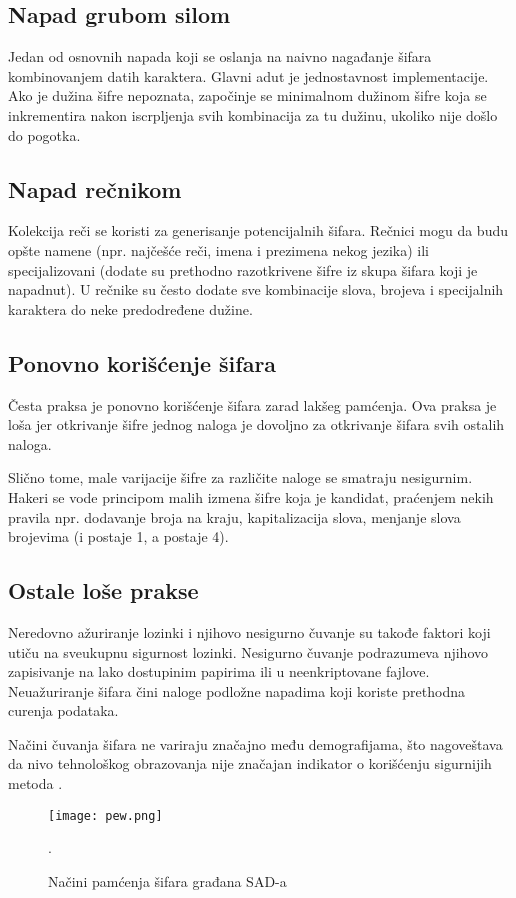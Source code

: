 \documentclass[fleqn, 12pt]{article}
\begin{document}
\subsection{Napad grubom silom}
\indent Jedan od osnovnih napada koji se oslanja na naivno nagađanje šifara kombinovanjem datih karaktera. Glavni adut je jednostavnost implementacije. Ako je dužina šifre nepoznata, započinje se minimalnom dužinom šifre koja se inkrementira nakon iscrpljenja svih kombinacija za tu dužinu, ukoliko nije došlo do pogotka\cite{napadi}.

\subsection{Napad rečnikom}
\indent Kolekcija reči se koristi za generisanje potencijalnih šifara. Rečnici mogu da budu opšte namene (npr. najčešće reči, imena i prezimena nekog jezika) ili specijalizovani (dodate su prethodno razotkrivene šifre iz skupa šifara koji je napadnut). U rečnike su često dodate sve kombinacije slova, brojeva i specijalnih karaktera do neke predodređene dužine\cite{napadi}. 

\subsection{Ponovno korišćenje šifara}
\indent Česta praksa je ponovno korišćenje šifara zarad lakšeg pamćenja. Ova praksa je loša jer otkrivanje šifre jednog naloga je dovoljno za otkrivanje šifara svih ostalih naloga. 

\indent Slično tome, male varijacije šifre za različite naloge se smatraju nesigurnim. Hakeri se vode principom malih izmena šifre koja je kandidat, praćenjem nekih pravila npr. dodavanje broja na kraju, kapitalizacija slova, menjanje slova brojevima (i postaje 1, a postaje 4).

\subsection{Ostale loše prakse}
\indent Neredovno ažuriranje lozinki i njihovo nesigurno čuvanje su takođe faktori koji utiču na sveukupnu sigurnost lozinki. Nesigurno čuvanje podrazumeva njihovo zapisivanje na lako dostupinim papirima ili u neenkriptovane fajlove. Neuažuriranje šifara čini naloge podložne napadima koji koriste prethodna curenja podataka. 

Načini čuvanja šifara ne variraju značajno među demografijama, što nagoveštava  da nivo tehnološkog obrazovanja nije značajan indikator o korišćenju sigurnijih metoda\cite{pew1} .  
\begin{figure}[H]
    \centering
    \texttt{[image: pew.png]}
    \caption{Načini pamćenja šifara građana SAD-a\cite{pew1}}.
    \label{fig:enter-label}
\end{figure}
\end{document}
